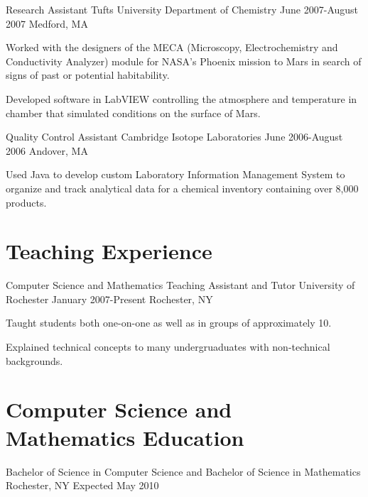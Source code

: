 \documentclass[letterpaper]{resume}
\begin{document}
\affiliation
{Research Assistant}
{Tufts University Department of Chemistry}
{June 2007-August 2007}
{Medford, MA}

\begin{compactitem}
	\item Worked with the designers of the MECA (Microscopy, Electrochemistry and Conductivity Analyzer) module for NASA's Phoenix mission to Mars in search of signs of past or potential habitability. \par
	\item Developed software in LabVIEW controlling the atmosphere and temperature in chamber that simulated conditions on the surface of Mars. \par
\end{compactitem}

\affiliation
{Quality Control Assistant}
{Cambridge Isotope Laboratories}
{June 2006-August 2006}
{Andover, MA}

\begin{compactitem}
       \item Used Java to develop custom Laboratory Information Management System to organize and track analytical data for a chemical inventory containing over 8,000 products. \par
\end{compactitem}

\section{Teaching Experience}

\affiliation
{Computer Science and Mathematics Teaching Assistant and Tutor}
{University of Rochester}
{January 2007-Present}
{Rochester, NY}

\begin{compactitem}
	\item Taught students both one-on-one as well as in groups of approximately 10. \par
	\item Explained technical concepts to many undergruaduates with non-technical backgrounds. \par
\end{compactitem}

\section{Computer Science and Mathematics Education}

            {Bachelor of Science in Computer Science and Bachelor of Science in Mathematics}
			{Rochester, NY}
			{Expected May 2010}
\end{document}
